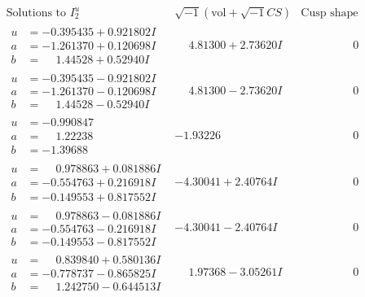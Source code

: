 \documentclass[1p]{elsarticle_modified}
\theoremstyle{definition}
\newcommand{\I}{\sqrt{-1}}
\begin{document}
$$\begin{array}{c|c|c}  
\text{Solutions to }I^u_{2}& \I (\text{vol} + \sqrt{-1}CS) & \text{Cusp shape}\\
 \hline 
\begin{aligned}
u &= -0.395435 + 0.921802 I \\
a &= -1.261370 + 0.120698 I \\
b &= \phantom{-}1.44528 + 0.52940 I\end{aligned}
 & \phantom{-}4.81300 + 2.73620 I & \phantom{-0.000000 } 0 \\ \hline\begin{aligned}
u &= -0.395435 - 0.921802 I \\
a &= -1.261370 - 0.120698 I \\
b &= \phantom{-}1.44528 - 0.52940 I\end{aligned}
 & \phantom{-}4.81300 - 2.73620 I & \phantom{-0.000000 } 0 \\ \hline\begin{aligned}
u &= -0.990847\phantom{ +0.000000I} \\
a &= \phantom{-}1.22238\phantom{ +0.000000I} \\
b &= -1.39688\phantom{ +0.000000I}\end{aligned}
 & -1.93226\phantom{ +0.000000I} & \phantom{-0.000000 } 0 \\ \hline\begin{aligned}
u &= \phantom{-}0.978863 + 0.081886 I \\
a &= -0.554763 + 0.216918 I \\
b &= -0.149553 + 0.817552 I\end{aligned}
 & -4.30041 + 2.40764 I & \phantom{-0.000000 } 0 \\ \hline\begin{aligned}
u &= \phantom{-}0.978863 - 0.081886 I \\
a &= -0.554763 - 0.216918 I \\
b &= -0.149553 - 0.817552 I\end{aligned}
 & -4.30041 - 2.40764 I & \phantom{-0.000000 } 0 \\ \hline\begin{aligned}
u &= \phantom{-}0.839840 + 0.580136 I \\
a &= -0.778737 - 0.865825 I \\
b &= \phantom{-}1.242750 - 0.644513 I\end{aligned}
 & \phantom{-}1.97368 - 3.05261 I & \phantom{-0.000000 } 0 \\ \hline\begin{aligned}

\end{aligned}
\end{array}$$
\end{document}
